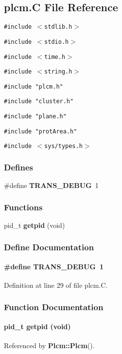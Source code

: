 \subsection{plcm.C File Reference}
\label{plcm.C}
{\tt \#include $<$stdlib.h$>$}\par
{\tt \#include $<$stdio.h$>$}\par
{\tt \#include $<$time.h$>$}\par
{\tt \#include $<$string.h$>$}\par
{\tt \#include "plcm.h"}\par
{\tt \#include "cluster.h"}\par
{\tt \#include "plane.h"}\par
{\tt \#include "prot\-Area.h"}\par
{\tt \#include $<$sys/types.h$>$}\par
\subsubsection*{Defines}
\begin{CompactItemize}
\item 
\#define {\bf TRANS\_\-DEBUG}\ 1
\end{CompactItemize}
\subsubsection*{Functions}
\begin{CompactItemize}
\item 
pid\_\-t {\bf getpid} (void)
\end{CompactItemize}


\subsubsection{Define Documentation}
\label{plcm.C_a0}
\paragraph{\setlength{\rightskip}{0pt plus 5cm}\#define TRANS\_\-DEBUG\ 1}\hfill



Definition at line 29 of file plcm.C.

\subsubsection{Function Documentation}
\label{plcm.C_a1}
\paragraph{\setlength{\rightskip}{0pt plus 5cm}pid\_\-t getpid (void)}\hfill



Referenced by {\bf Plcm::Plcm}().